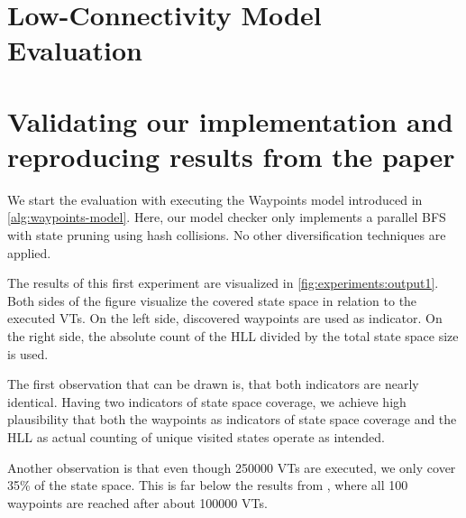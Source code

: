 \documentclass[
fancyheadings, %
%
%
]{stsreprt}
\begin{document}

\section{Low-Connectivity Model Evaluation}
\label{section:evaluation:low-connectivity-model-evaluation}

\section{Validating our implementation and reproducing results from the paper}

We start the evaluation with executing the Waypoints model introduced in \cref{alg:waypoints-model}.
Here, our model checker only implements a parallel BFS with state pruning using hash collisions.
No other diversification techniques are applied.

The results of this first experiment are visualized in \cref{fig:experiments:output1}.
Both sides of the figure visualize the covered state space in relation to the executed VTs.
On the left side, discovered waypoints are used as indicator.
On the right side, the absolute count of the HLL divided by the total state space size is used.

The first observation that can be drawn is, that both indicators are nearly identical.
Having two indicators of state space coverage, we achieve high plausibility that both the waypoints as indicators of state space coverage and the HLL as actual counting of unique visited states operate as intended.

Another observation is that even though \num{250000} VTs are executed, we only cover 35\% of the state space.
This is far below the results from \cite{DeFrancisco2020.Grapple}, where all 100 waypoints are reached after about \num{100000} VTs.
\end{document}
